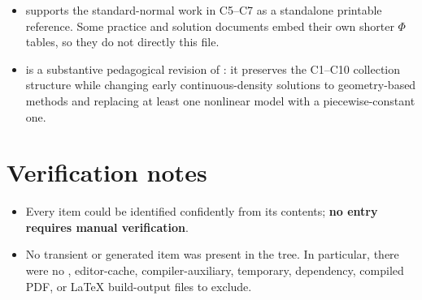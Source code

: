 \begin{itemize}
\item {} supports the standard-normal work in C5–C7 as a standalone printable reference. Some practice and solution documents embed their own shorter \ensuremath{\Phi} tables, so they do not directly  this file.
\item {} is a substantive pedagogical revision of : it preserves the C1–C10 collection structure while changing early continuous-density solutions to geometry-based methods and replacing at least one nonlinear model with a piecewise-constant one.
\end{itemize}

\section{Verification notes}

\begin{itemize}
\item Every item could be identified confidently from its contents; \textbf{no entry requires manual verification}.
\item No transient or generated item was present in the tree. In particular, there were no , editor-cache, compiler-auxiliary, temporary, dependency, compiled PDF, or LaTeX build-output files to exclude.
\end{itemize}

